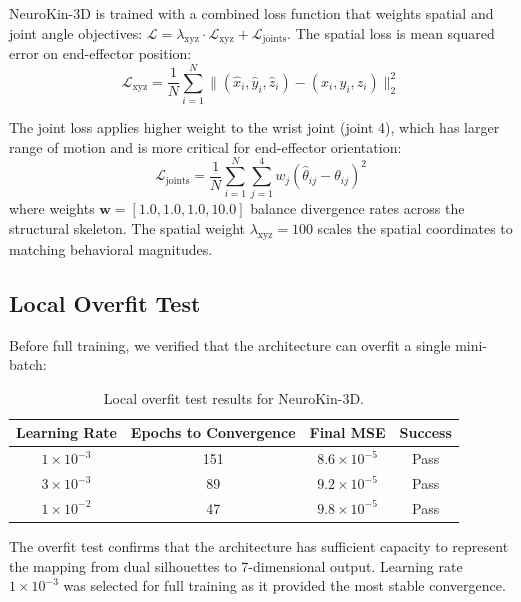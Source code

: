 \documentclass[12pt,a4paper,oneside]{report}
\begin{document}
NeuroKin-3D is trained with a combined loss function that weights spatial and joint angle objectives: $\mathcal{L} = \lambda_{\text{xyz}} \cdot \mathcal{L}_{\text{xyz}} + \mathcal{L}_{\text{joints}}$. The spatial loss is mean squared error on end-effector position:
\begin{equation}
\mathcal{L}_{\text{xyz}} = \frac{1}{N} \sum_{i=1}^{N} \|(\hat{x}_i, \hat{y}_i, \hat{z}_i) - (x_i, y_i, z_i)\|_2^2
\end{equation}

The joint loss applies higher weight to the wrist joint (joint 4), which has larger range of motion and is more critical for end-effector orientation:
\begin{equation}
\mathcal{L}_{\text{joints}} = \frac{1}{N} \sum_{i=1}^{N} \sum_{j=1}^{4} w_j (\hat{\theta}_{ij} - \theta_{ij})^2
\end{equation}
where weights $\mathbf{w} = [1.0, 1.0, 1.0, 10.0]$ balance divergence rates across the structural skeleton. The spatial weight $\lambda_{\text{xyz}} = 100$ scales the spatial coordinates to matching behavioral magnitudes.

\subsection{Local Overfit Test}

Before full training, we verified that the architecture can overfit a single mini-batch:

\begin{table}[H]
\centering
\caption{Local overfit test results for NeuroKin-3D.}
\label{tab:overfit_test}
\begin{tabular}{cccc}
\toprule
Learning Rate & Epochs to Convergence & Final MSE & Success \\
\midrule
$1 \times 10^{-3}$ & 151 & $8.6 \times 10^{-5}$ & Pass \\
$3 \times 10^{-3}$ & 89 & $9.2 \times 10^{-5}$ & Pass \\
$1 \times 10^{-2}$ & 47 & $9.8 \times 10^{-5}$ & Pass \\
\bottomrule
\end{tabular}
\end{table}

The overfit test confirms that the architecture has sufficient capacity to represent the mapping from dual silhouettes to 7-dimensional output. Learning rate $1 \times 10^{-3}$ was selected for full training as it provided the most stable convergence.
\end{document}
